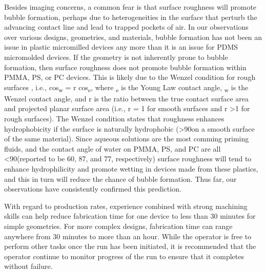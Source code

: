 {Besides imaging concerns, a common fear is that surface roughness will promote bubble formation, perhaps due to heterogeneities in the surface that perturb the advancing contact line and lead to trapped pockets of air. In our observations over various designs, geometries, and materials, bubble formation has not been an issue in plastic micromilled devices any more than it is an issue for PDMS micromolded devices. If the geometry is not inherently prone to bubble formation, then surface roughness does not promote bubble formation within PMMA, PS, or PC devices. This is likely due to the Wenzel condition for rough surfaces \cite{Wenzel2002RESISTANCEWATER,Ouali2013}, i.e., cos\texttheta\textsubscript{w} = r cos\texttheta\textsubscript{e}, where \texttheta\textsubscript{e} is the Young Law contact angle, \texttheta\textsubscript{w} is the Wenzel contact angle, and r is the ratio between the true contact surface area and projected planar surface area (i.e., r = 1 for smooth surfaces and r \textgreater 1 for rough surfaces). The Wenzel condition states that roughness enhances hydrophobicity if the surface is naturally hydrophobic (\texttheta\textgreater90\textdegree on a smooth surface of the same material). Since aqueous solutions are the most comming priming fluids, and the contact angle of water on PMMA, PS, and PC are all \textless 90\textdegree (reported to be 60\textdegree, 87\textdegree, and 77\textdegree, respectively)\cite{Montez2011} surface roughness will tend to enhance hydrophilicity and promote wetting in devices made from these plastics, and this in turn will reduce the chance of bubble formation. Thus far, our observations have consistently confirmed this prediction.

With regard to production rates, experience combined with strong machining skills can help reduce fabrication time for one device to less than 30 minutes for simple geometries. For more complex designs, fabrication time can range anywhere from 30 minutes to more than an hour. While the operator is free to perform other tasks once the run has been initiated, it is recommended that the operator continue to monitor progress of the run to ensure that it completes without failure.

}
